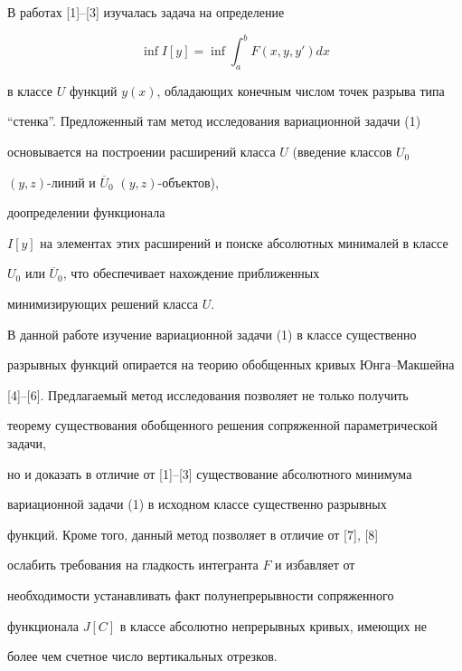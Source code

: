 \label{begin}








В работах [1]--[3] изучалась задача на определение


\begin{equation}


\inf I[y]=\inf\int_a^b F(x,y,y')dx


\end{equation}


в классе $U$ функций $y(x)$, обладающих конечным числом точек разрыва типа


``стенка''. Предложенный там метод исследования вариационной задачи (1)


основывается на построении расширений класса $U$ (введение классов $U_0$\;


$(y,z)$-линий и $\overline{U}_0$\; $(y,z)$-объектов),


доопределении функционала


$I[y]$ на элементах этих расширений и поиске абсолютных минималей в классе


$U_0$ или $\overline{U}_0$, что обеспечивает нахождение приближенных


минимизирующих решений класса $U$.





В данной работе изучение вариационной задачи (1) в классе существенно


разрывных функций опирается на теорию обобщенных кривых Юнга--Макшейна


[4]--[6]. Предлагаемый метод исследования позволяет не только получить


теорему существования обобщенного решения сопряженной параметрической задачи,


но и доказать в отличие от [1]--[3] существование абсолютного минимума


вариационной задачи (1) в исходном классе существенно разрывных


функций. Кроме того, данный метод позволяет в отличие от [7], [8]


ослабить требования на гладкость интегранта $F$ и избавляет от


необходимости устанавливать факт полунепрерывности сопряженного


функционала $J[C]$ в классе абсолютно непрерывных кривых, имеющих не


более чем счетное число вертикальных отрезков.





